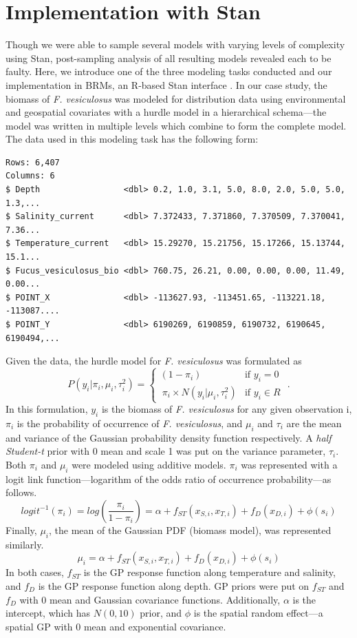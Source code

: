 \documentclass[
  12pt,
  oneside]{book}
\theoremstyle{definition}
\theoremstyle{definition}
\theoremstyle{definition}
\theoremstyle{remark}
\begin{document}
\hypertarget{implementation-with-stan}{%
\section{Implementation with Stan}\label{implementation-with-stan}}

Though we were able to sample several models with varying levels of complexity using Stan, post-sampling analysis of all resulting models revealed each to be faulty.
Here, we introduce one of the three modeling tasks \citet{Kotta2019} conducted and our implementation in BRMs, an R-based Stan interface \citep{Burkner2017}.
In our case study, the biomass of \emph{F. vesiculosus} was modeled for distribution data using environmental and geospatial covariates with a hurdle model in a hierarchical schema---the model was written in multiple levels which combine to form the complete model.
The data used in this modeling task has the following form:

\begin{verbatim}
Rows: 6,407
Columns: 6
$ Depth                 <dbl> 0.2, 1.0, 3.1, 5.0, 8.0, 2.0, 5.0, 5.0, 1.3,...
$ Salinity_current      <dbl> 7.372433, 7.371860, 7.370509, 7.370041, 7.36...
$ Temperature_current   <dbl> 15.29270, 15.21756, 15.17266, 15.13744, 15.1...
$ Fucus_vesiculosus_bio <dbl> 760.75, 26.21, 0.00, 0.00, 0.00, 11.49, 0.00...
$ POINT_X               <dbl> -113627.93, -113451.65, -113221.18, -113087....
$ POINT_Y               <dbl> 6190269, 6190859, 6190732, 6190645, 6190494,...
\end{verbatim}

Given the data, the hurdle model for \emph{F. vesiculosus} was formulated as
\[P(y_i|\pi_i,\mu_i,\tau_i^2)= \begin{cases}(1-\pi_i) & \textrm{if }y_i=0\\\ \pi_i \times N(y_i|\mu_i,\tau_i^2) & \textrm{if }y_i \in R\end{cases}\textrm{ .}\]
In this formulation, \(y_i\) is the biomass of \emph{F. vesiculosus} for any given observation i, \(\pi_i\) is the probability of occurrence of \emph{F. vesiculosus}, and \(\mu_i\) and \(\tau_i\) are the mean and variance of the Gaussian probability density function respectively.
A \emph{half Student-t} prior with 0 mean and scale 1 was put on the variance parameter, \(\tau_i\).
Both \(\pi_i\) and \(\mu_i\) were modeled using additive models.
\(\pi_i\) was represented with a logit link function---logarithm of the odds ratio of occurrence probability---as follows.
\[logit^{-1}(\pi_i)=log( \frac{\pi_i}{1-\pi_i})=\alpha+f_{ST}(x_{S,i},x_{T,i})+f_D(x_{D,i})+ \phi(s_i)\]
Finally, \(\mu_i\), the mean of the Gaussian PDF (biomass model), was represented similarly.
\[\mu_i= \alpha+f_{ST}(x_{S,i},x_{T,i})+f_D(x_{D,i})+ \phi(s_i)\]
In both cases, \(f_{ST}\) is the GP response function along temperature and salinity, and \(f_{D}\) is the GP response function along depth.
GP priors were put on \(f_{ST}\) and \(f_{D}\) with 0 mean and Gaussian covariance functions.
Additionally, \(\alpha\) is the intercept, which has \(N(0,10)\) prior, and \(\phi\) is the spatial random effect---a spatial GP with 0 mean and exponential covariance.
\end{document}
